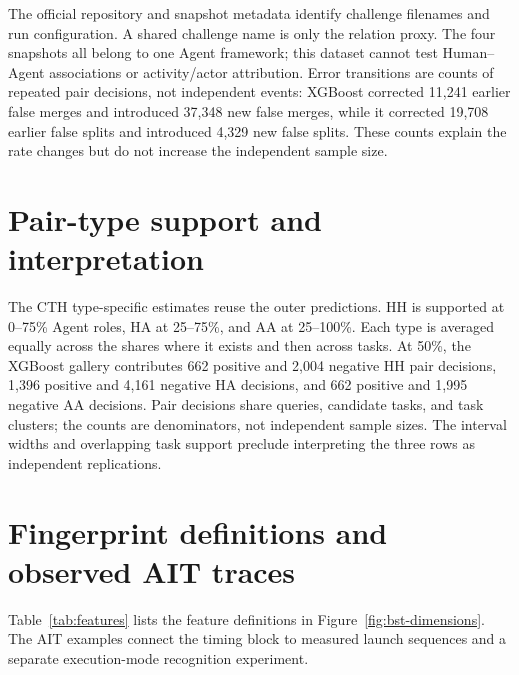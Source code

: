 \documentclass[10pt]{article}
\begin{document}
The official repository and snapshot metadata identify challenge filenames and run configuration. A shared challenge name is only the relation proxy. The four snapshots all belong to one Agent framework; this dataset cannot test Human--Agent associations or activity/actor attribution. Error transitions are counts of repeated pair decisions, not independent events: XGBoost corrected 11,241 earlier false merges and introduced 37,348 new false merges, while it corrected 19,708 earlier false splits and introduced 4,329 new false splits. These counts explain the rate changes but do not increase the independent sample size.

\section{Pair-type support and interpretation}\label{app:pair-types}
The CTH type-specific estimates reuse the outer predictions. HH is supported at 0--75\% Agent roles, HA at 25--75\%, and AA at 25--100\%. Each type is averaged equally across the shares where it exists and then across tasks. At 50\%, the XGBoost gallery contributes 662 positive and 2,004 negative HH pair decisions, 1,396 positive and 4,161 negative HA decisions, and 662 positive and 1,995 negative AA decisions. Pair decisions share queries, candidate tasks, and task clusters; the counts are denominators, not independent sample sizes. The interval widths and overlapping task support preclude interpreting the three rows as independent replications.

\FloatBarrier
\section{Fingerprint definitions and observed AIT traces}\label{app:overnight-figures}
Table~\ref{tab:features} lists the feature definitions in Figure~\ref{fig:bst-dimensions}. The AIT examples connect the timing block to measured launch sequences and a separate execution-mode recognition experiment.
\end{document}

